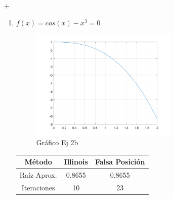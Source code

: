 +\documentclass{udpreport}
\begin{document}
\begin{enumerate}
\begin{enumerate}
        \item $f(x)= cos(x) - x^3 =0$
        \begin{figure}[H]
            \centering
            \includegraphics[width=7cm]{Ec22.png}
             \caption{Gráfico Ej 2b}
        \end{figure}
        \begin{table}[H]
            \centering
           \begin{tabular} { |c|c|c| }
                \hline
                Método       & Illinois & Falsa Posición  \\
                \hline
                Raíz Aprox. &  0.8655      &    0.8655       \\
                \hline
                Iteraciones   &    10       &    23          \\
                \hline
                \end{tabular}
            \end{table}
        

\end{enumerate}
\end{enumerate}
\end{document}
